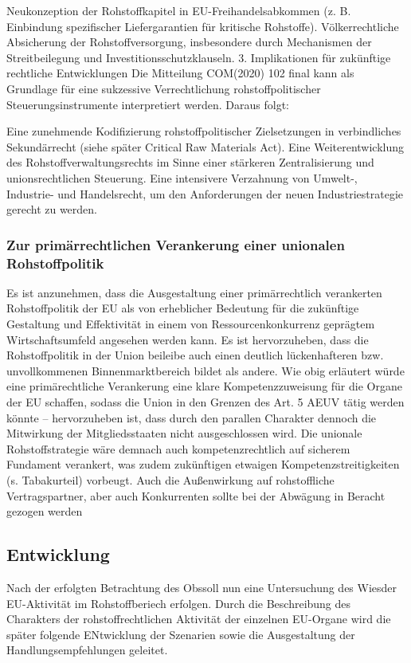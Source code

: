 \documentclass[12pt,a4paper,oneside]{book} %
\begin{document}
Neukonzeption der Rohstoffkapitel in EU-Freihandelsabkommen (z. B. Einbindung spezifischer Liefergarantien für kritische Rohstoffe).
Völkerrechtliche Absicherung der Rohstoffversorgung, insbesondere durch Mechanismen der Streitbeilegung und Investitionsschutzklauseln.
3. Implikationen für zukünftige rechtliche Entwicklungen
Die Mitteilung COM(2020) 102 final kann als Grundlage für eine sukzessive Verrechtlichung rohstoffpolitischer Steuerungsinstrumente interpretiert werden. Daraus folgt:

Eine zunehmende Kodifizierung rohstoffpolitischer Zielsetzungen in verbindliches Sekundärrecht (siehe später Critical Raw Materials Act).
Eine Weiterentwicklung des Rohstoffverwaltungsrechts im Sinne einer stärkeren Zentralisierung und unionsrechtlichen Steuerung.
Eine intensivere Verzahnung von Umwelt-, Industrie- und Handelsrecht, um den Anforderungen der neuen Industriestrategie gerecht zu werden.
	
\subsubsection{Zur primärrechtlichen Verankerung einer unionalen Rohstoffpolitik}
Es ist anzunehmen, dass die Ausgestaltung einer primärrechtlich verankerten Rohstoffpolitik der EU als von erheblicher Bedeutung für die zukünftige Gestaltung und Effektivität in einem von Ressourcenkonkurrenz geprägtem Wirtschaftsumfeld angesehen werden kann. Es ist hervorzuheben, dass die Rohstoffpolitik in der Union beileibe auch einen deutlich lückenhafteren bzw. unvollkommenen Binnenmarktbereich bildet als andere.  Wie obig erläutert würde eine primärechtliche Verankerung eine klare Kompetenzzuweisung für die Organe der EU schaffen, sodass die Union in den Grenzen des Art. 5 AEUV tätig werden könnte -- hervorzuheben ist, dass durch den parallen Charakter dennoch die Mitwirkung der Mitgliedsstaaten nicht ausgeschlossen wird. Die unionale Rohstoffstrategie wäre demnach auch kompetenzrechtlich auf sicherem Fundament verankert, was zudem zukünftigen etwaigen Kompetenzstreitigkeiten (s. Tabakurteil) vorbeugt. Auch die Außenwirkung auf rohstoffliche Vertragspartner, aber auch Konkurrenten sollte bei der Abwägung in Beracht gezogen werden
	
		
\subsection{Entwicklung}

Nach der erfolgten Betrachtung des \glqq Obs\grqq soll nun eine Untersuchung des \glqq Wies\grqq der EU-Aktivität im Rohstoffberiech erfolgen. Durch die Beschreibung des Charakters der rohstoffrechtlichen Aktivität der einzelnen EU-Organe wird die später folgende ENtwicklung der Szenarien sowie die Ausgestaltung der Handlungsempfehlungen geleitet.
\end{document}
